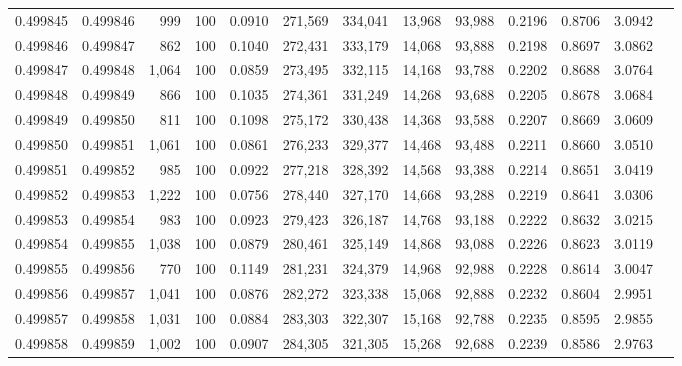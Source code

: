 \begin{tabular}{rrrrrrrrrrrrr}
0.499845 & 0.499846 &   999 & 100 &                                     0.0910 & 271,569 & 334,041 &  13,968 &  93,988 & 0.2196 & 0.8706 & 3.0942 \\
0.499846 & 0.499847 &   862 & 100 &                                     0.1040 & 272,431 & 333,179 &  14,068 &  93,888 & 0.2198 & 0.8697 & 3.0862 \\
0.499847 & 0.499848 & 1,064 & 100 &                                     0.0859 & 273,495 & 332,115 &  14,168 &  93,788 & 0.2202 & 0.8688 & 3.0764 \\
0.499848 & 0.499849 &   866 & 100 &                                     0.1035 & 274,361 & 331,249 &  14,268 &  93,688 & 0.2205 & 0.8678 & 3.0684 \\
0.499849 & 0.499850 &   811 & 100 &                                     0.1098 & 275,172 & 330,438 &  14,368 &  93,588 & 0.2207 & 0.8669 & 3.0609 \\
0.499850 & 0.499851 & 1,061 & 100 &                                     0.0861 & 276,233 & 329,377 &  14,468 &  93,488 & 0.2211 & 0.8660 & 3.0510 \\
0.499851 & 0.499852 &   985 & 100 &                                     0.0922 & 277,218 & 328,392 &  14,568 &  93,388 & 0.2214 & 0.8651 & 3.0419 \\
0.499852 & 0.499853 & 1,222 & 100 &                                     0.0756 & 278,440 & 327,170 &  14,668 &  93,288 & 0.2219 & 0.8641 & 3.0306 \\
0.499853 & 0.499854 &   983 & 100 &                                     0.0923 & 279,423 & 326,187 &  14,768 &  93,188 & 0.2222 & 0.8632 & 3.0215 \\
0.499854 & 0.499855 & 1,038 & 100 &                                     0.0879 & 280,461 & 325,149 &  14,868 &  93,088 & 0.2226 & 0.8623 & 3.0119 \\
0.499855 & 0.499856 &   770 & 100 &                                     0.1149 & 281,231 & 324,379 &  14,968 &  92,988 & 0.2228 & 0.8614 & 3.0047 \\
0.499856 & 0.499857 & 1,041 & 100 &                                     0.0876 & 282,272 & 323,338 &  15,068 &  92,888 & 0.2232 & 0.8604 & 2.9951 \\
0.499857 & 0.499858 & 1,031 & 100 &                                     0.0884 & 283,303 & 322,307 &  15,168 &  92,788 & 0.2235 & 0.8595 & 2.9855 \\
0.499858 & 0.499859 & 1,002 & 100 &                                     0.0907 & 284,305 & 321,305 &  15,268 &  92,688 & 0.2239 & 0.8586 & 2.9763 \\

\end{tabular}
